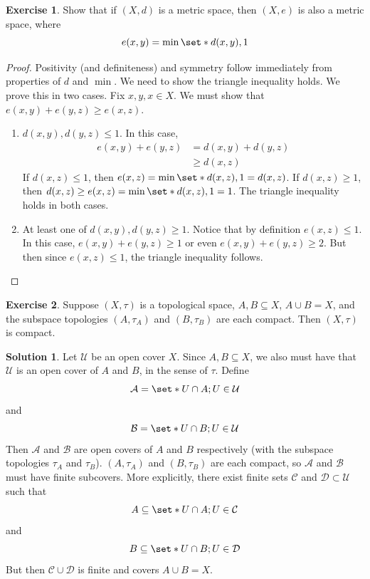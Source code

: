 \documentclass[11pt]{article}
\numberwithin{equation}{section}
\theoremstyle{plain}
\theoremstyle{definition}
\newtheorem*{solution}{\color{Goldenrod}Solution}
\newtheorem{exercise}{\color{YellowOrange}Exercise}[section]
\def\Set{\set*}%
\def\ss{\subset}
\def\sse{\subseteq}
\newcommand{\1}{\mathbbm 1}
\def\t{\tau}
\newcommand{\cC}{\mathcal C}
\newcommand{\uU}{\mathcal U}
\begin{document}
\begin{exercise}
	Show that if $(X,d)$ is a metric space, then $(X,e)$ is also a metric space, where 
	\begin{equation}
		e(x,y) = \min\Set{d(x,y), 1}
	\end{equation}
\end{exercise}
\begin{proof}
	Positivity (and definiteness) and symmetry follow immediately from properties of $d$ and $\min$. We need to show the triangle inequality holds. We prove this in two cases. Fix $x,y,x \in X$. We must show that $e(x,y) + e(y,z) \geq e(x,z)$. 
	\begin{enumerate}
		\item $d(x,y), d(y,z) \leq 1$. In this case, 
		\begin{align*}
			e(x,y) + e(y,z) &= d(x,y) + d(y,z) \\
			&\geq d(x,z) \tag{$\triangle$ inequality with $d$}
		\end{align*}
		If $d(x,z) \leq 1$, then $e(x,z) = \min\Set{d(x,z),1} = d(x,z)$. If $d(x,z) \geq 1$, then $d(x,z) \geq e(x,z) = \min\Set{d(x,z),1} = 1$. The triangle inequality holds in both cases. 
		\item At least one of $d(x,y), d(y,z) \geq 1$. Notice that by definition $e(x,z) \leq 1$. In this case, $e(x,y) + e(y,z) \geq 1$ or even $e(x,y) + e(y,z) \geq 2$. But then since $e(x,z) \leq 1$, the triangle inequality follows. 
	\end{enumerate}
\end{proof}


\begin{exercise}
	Suppose $(X,\t)$ is a topological space, $A,B\sse X$, $A\cup B = X$, and the subspace topologies $(A,\t_A)$ and $(B,\t_B)$ are each compact. Then $(X,\t)$ is compact.  
\end{exercise}
\begin{solution}
	Let $\uU$ be an open cover $X$. Since $A,B\sse X$, we also must have that $\uU$ is an open cover of $A$ and $B$, in the sense of $\t$. Define
	\begin{equation}
		\mathcal{A} = \Set{U \cap A; U \in \uU}
	\end{equation}
	and
	\begin{equation}
		\mathcal{B} = \Set{U \cap B; U \in \uU}
	\end{equation}
	Then $\mathcal{A}$ and $\mathcal{B}$ are open covers of $A$ and $B$ respectively (with the subspace topologies $\t_A$ and $\t_B$). $(A,\t_A)$ and $(B,\t_B)$ are each compact, so $\mathcal{A}$ and $\mathcal{B}$ must have finite subcovers. More explicitly, there exist finite sets $\mathcal{C}$ and $\mathcal{D} \ss \uU$ such that 
	\begin{equation}
		A \sse \Set{U \cap A; U \in \cC} 	
	\end{equation} 
	and
	\begin{equation}
		B \sse \Set{U \cap B; U \in \mathcal{D}} 	
	\end{equation} 
	But then $\mathcal{C} \cup \mathcal{D}$ is finite and covers $A \cup B = X$. 
\end{solution}
\end{document}
